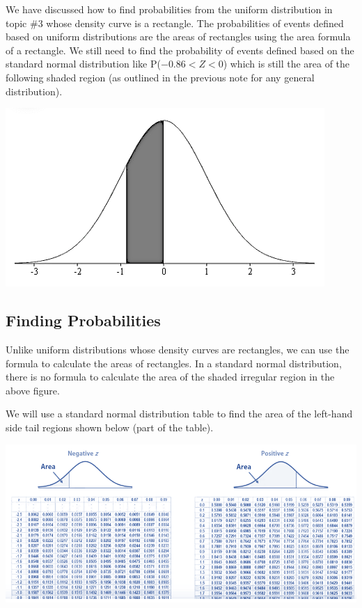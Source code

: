 \documentclass[
]{book}
\begin{document}
We have discussed how to find probabilities from the uniform distribution in topic \#3 whose density curve is a rectangle. The probabilities of events defined based on uniform distributions are the areas of rectangles using the area formula of a rectangle. We still need to find the probability of events defined based on the standard normal distribution like P(\(-0.86 < Z < 0\)) which is still the area of the following shaded region (as outlined in the previous note for any general distribution).

\begin{center}\includegraphics[width=0.6\linewidth]{week04/z-Prob} \end{center}

\hfill\break

\hypertarget{finding-probabilities}{%
\subsection{Finding Probabilities}\label{finding-probabilities}}

Unlike uniform distributions whose density curves are rectangles, we can use the formula to calculate the areas of rectangles. In a standard normal distribution, there is no formula to calculate the area of the shaded irregular region in the above figure.

We will use a standard normal distribution table to find the area of the left-hand side tail regions shown below (part of the table).

\begin{center}\includegraphics[width=0.6\linewidth]{week04/z-LeftTailArea} \end{center}
\end{document}
